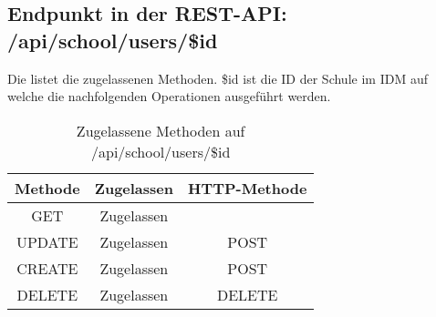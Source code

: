 \subsection{Endpunkt in der REST-API: /api/school/users/\$id}
Die  listet die zugelassenen Methoden. 
\$id ist die ID der Schule im IDM auf welche die nachfolgenden Operationen ausgeführt werden.

\begin{table}[!htbp]
	\begin{tabular}{|c|c|c|}
		\hline
			\textbf{Methode} & \textbf{Zugelassen} & \textbf{HTTP-Methode} \\ \hline
			GET & Zugelassen &  \\ \hline
			UPDATE & Zugelassen & POST \\ \hline 
			CREATE & Zugelassen & POST \\ \hline 
			DELETE & Zugelassen & DELETE \\ \hline
	\end{tabular}

		\caption{Zugelassene Methoden auf /api/school/users/\$id}
		\label{tab:end:rest:api:school:users:id:meth}
\end{table}





